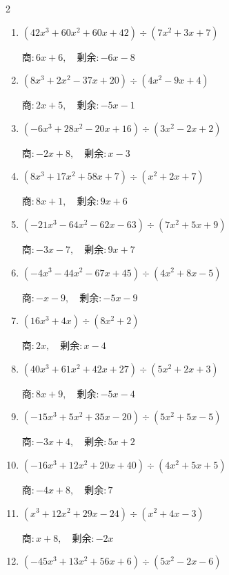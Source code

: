 \begin{multicols}{2}
\begin{enumerate}
  \item $(42x^{3}+60x^{2}+60x+42) \div (7x^{2}+3x+7)$

        $商 : 6x+6, \quad 剰余 : -6x-8$

  \item $(8x^{3}+2x^{2}-37x+20) \div (4x^{2}-9x+4)$

        $商 : 2x+5, \quad 剰余 : -5x-1$

  \item $(-6x^{3}+28x^{2}-20x+16) \div (3x^{2}-2x+2)$

        $商 : -2x+8, \quad 剰余 : x-3$

  \item $(8x^{3}+17x^{2}+58x+7) \div (x^{2}+2x+7)$

        $商 : 8x+1, \quad 剰余 : 9x+6$

\columnbreak %

\resetques

  \item $(-21x^{3}-64x^{2}-62x-63) \div (7x^{2}+5x+9)$

        $商 : -3x-7, \quad 剰余 : 9x+7$

  \item $(-4x^{3}-44x^{2}-67x+45) \div (4x^{2}+8x-5)$

        $商 : -x-9, \quad 剰余 : -5x-9$

  \item $(16x^{3}+4x) \div (8x^{2}+2)$

        $商 : 2x, \quad 剰余 : x-4$

  \item $(40x^{3}+61x^{2}+42x+27) \div (5x^{2}+2x+3)$

        $商 : 8x+9, \quad 剰余 : -5x-4$

  \item $(-15x^{3}+5x^{2}+35x-20) \div (5x^{2}+5x-5)$

        $商 : -3x+4, \quad 剰余 : 5x+2$

\columnbreak %

  \item $(-16x^{3}+12x^{2}+20x+40) \div (4x^{2}+5x+5)$

        $商 : -4x+8, \quad 剰余 : 7$

  \item $(x^{3}+12x^{2}+29x-24) \div (x^{2}+4x-3)$

        $商 : x+8, \quad 剰余 : -2x$

  \item $(-45x^{3}+13x^{2}+56x+6) \div (5x^{2}-2x-6)$


\end{enumerate}
\end{multicols}
